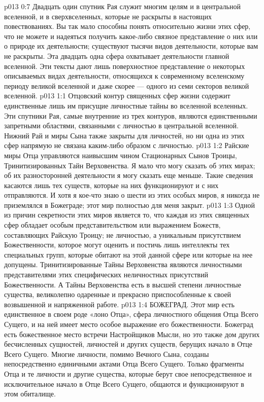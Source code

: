 \vs p013 0:7 Двадцать один спутник Рая служит многим целям и в центральной вселенной, и в сверхвселенных, которые не раскрыты в настоящих повествованиях. Вы так мало способны понять относительно жизни этих сфер, что не можете и надеяться получить какое\hyp{}либо связное представление о них или о природе их деятельности; существуют тысячи видов деятельности, которые вам не раскрыты. Эта двадцать одна сфера охватывает  деятельности главной вселенной. Эти тексты дают лишь поверхностное представление о некоторых описываемых видах деятельности, относящихся к современному вселенскому периоду великой вселенной и даже скорее --- одного из семи секторов великой вселенной.
\vs p013 1:1 Отцовский контур священных сфер жизни содержит единственные лишь им присущие личностные тайны во вселенной вселенных. Эти спутники Рая, самые внутренние из трех контуров, являются единственными запретными областями, связанными с личностью в центральной вселенной. Нижний Рай и миры Сына также закрыты для личностей, но ни одна из этих сфер напрямую не связана каким\hyp{}либо образом с личностью.
\vs p013 1:2 Райские миры Отца управляются наивысшим чином Стационарных Сынов Троицы, Тринитизированных Тайн Верховенства. Я мало что могу сказать об этих мирах; об их разносторонней деятельности я могу сказать еще меньше. Такие сведения касаются лишь тех существ, которые на них функционируют и с них отправляются. И хотя я кое\hyp{}что знаю о шести из этих особых миров, я никогда не приземлялся в Божеграде; этот мир полностью для меня закрыт.
\vs p013 1:3 Одной из причин секретности этих миров является то, что каждая из этих священных сфер обладает особым представительством или выражением Божеств, составляющих Райскую Троицу; не личностью, а уникальным присутствием Божественности, которое могут оценить и постичь лишь интеллекты тех специальных групп, которые обитают на этой данной сфере или которые на нее допущены. Тринитизированные Тайны Верховенства являются личностными представителями этих специфических неличностных присутствий Божественности. А Тайны Верховенства есть в высшей степени личностные существа, великолепно одаренные и прекрасно приспособленные к своей возвышенной и напряженной работе.
\vs p013 1:4 \pc {}\bibnobreakspace БОЖЕГРАД. Этот мир есть единственное в своем роде «лоно Отца», сфера личностного общения Отца Всего Сущего, и на ней имеет место особое выражение его божественности. Божеград есть божественное место встречи Настройщиков Мысли, но это также дом других бесчисленных сущностей, личностей и других существ, берущих начало в Отце Всего Сущего. Многие личности, помимо Вечного Сына, созданы непосредственно единичными актами Отца Всего Сущего. Только фрагменты Отца и те личности и другие существа, которые берут свое непосредственное и исключительное начало в Отце Всего Сущего, общаются и функционируют в этом обиталище.
